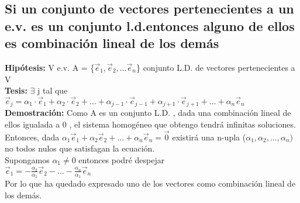 \documentclass[11pt]{article}
\begin{document}
\subsection{Si un conjunto de vectores pertenecientes a un e.v. es un conjunto l.d.entonces alguno de ellos es combinación lineal de los demás }
{\bfseries {Hipótesis:}} V e.v. A = \{$\vec{e}_{1}, \vec{e}_2,... \vec{e}_n $\} conjunto L.D. de vectores pertenecientes a V \\
{\bfseries {Tesis:}} $\exists$ j tal que $\vec{e}_j = \alpha_1\cdot\vec{e}_1 + \alpha_2\cdot\vec{e}_2 + \hdots + \alpha_{j-1}\cdot\vec{e}_{j-1} + \alpha_{j+1}\cdot\vec{e}_{j+1} + \hdots + \alpha_n\vec{e}_n$\\
{\bfseries Demostración:} Como A es un conjunto L.D. , dada una combinación lineal de ellos igualada a 0  , el sistema homogéneo que obtengo tendrá infinitas soluciones. \\
Entonces, dada $\alpha_1\vec{e}_1+\alpha_2\vec{e}_2+\hdots+\alpha_n\vec{e}_{n} = \vec{0}$ existirá una n-upla ($\alpha_1,\alpha_2,\hdots,\alpha_n)$ no todos nulos que satisfagan la ecuación.\\
Supongamos $\alpha_1 \neq 0$ entonces podré despejar \\
$\vec{e}_1 = -\frac{\alpha_2}{\alpha_1} \vec{e}_2 - \hdots - \frac{\alpha_n}{\alpha_1}\vec{e}_n$\\
Por lo que ha quedado expresado uno de los vectores como combinación lineal de los demás. 
\end{document}
